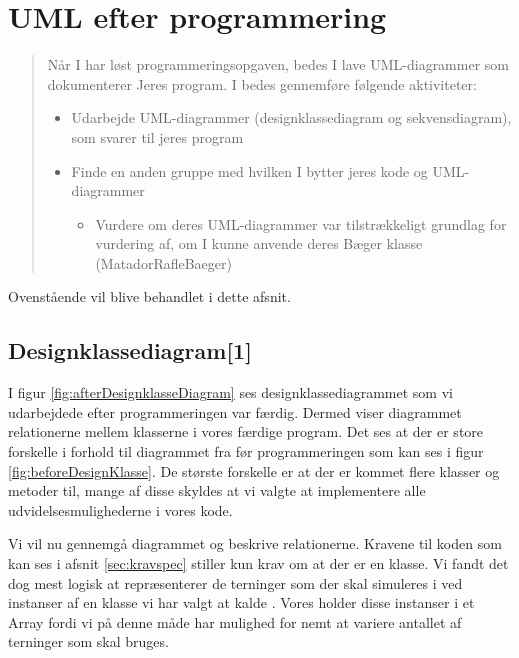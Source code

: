 \chapter{UML efter programmering}\label{ch:afterUML}
\begin{quote}
Når I har løst programmeringsopgaven, bedes I lave UML-diagrammer som dokumenterer Jeres
program. I bedes gennemføre følgende aktiviteter:
\begin{itemize}
\item Udarbejde UML-diagrammer (designklassediagram og sekvensdiagram), som svarer til jeres
program
\item Finde en anden gruppe med hvilken I bytter jeres kode og UML-diagrammer
\begin{itemize}
\item Vurdere om deres UML-diagrammer var tilstrækkeligt grundlag for vurdering af, om
I kunne anvende deres Bæger klasse (MatadorRafleBaeger)\cite{CDIOdel1}
\end{itemize}
\end{itemize}
\end{quote}
Ovenstående vil blive behandlet i dette afsnit.

\section{Designklassediagram[1]}\label{sec:afterDesignklasseDiagram}
I figur \vref{fig:afterDesignklasseDiagram} ses designklassediagrammet som vi udarbejdede efter programmeringen var færdig. Dermed viser diagrammet relationerne mellem klasserne i vores færdige program. Det ses at der er store forskelle i forhold til diagrammet fra før programmeringen som kan ses i figur \vref{fig:beforeDesignKlasse}. De største forskelle er at der er kommet flere klasser og metoder til, mange af disse skyldes at vi valgte at implementere alle udvidelsesmulighederne i vores kode.

Vi vil nu gennemgå diagrammet og beskrive relationerne. Kravene til koden som kan ses i afsnit \vref{sec:kravspec} stiller kun krav om at der er en  klasse. Vi fandt det dog mest logisk at repræsenterer de terninger som der skal simuleres i  ved instanser af en klasse vi har valgt at kalde . Vores  holder disse instanser i et Array fordi vi på denne måde har mulighed for nemt at variere antallet af terninger som skal bruges.

